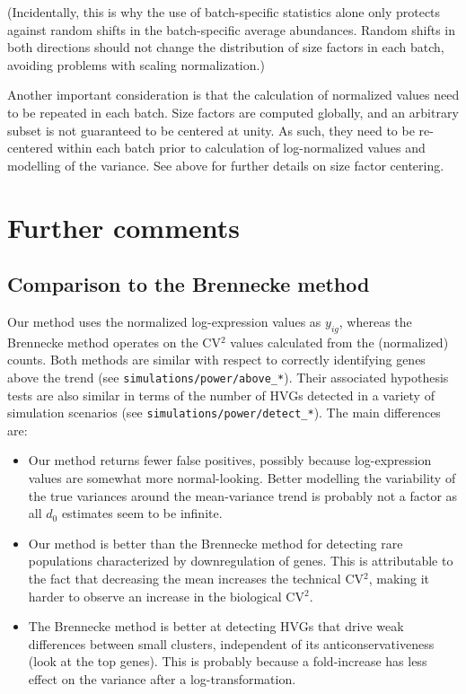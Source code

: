 \documentclass{article}
\begin{document}
(Incidentally, this is why the use of batch-specific statistics alone only protects against random shifts in the batch-specific average abundances.
Random shifts in both directions should not change the distribution of size factors in each batch, avoiding problems with scaling normalization.)

Another important consideration is that the calculation of normalized values need to be repeated in each batch.
Size factors are computed globally, and an arbitrary subset is not guaranteed to be centered at unity.
As such, they need to be re-centered within each batch prior to calculation of log-normalized values and modelling of the variance.
See above for further details on size factor centering.

\section{Further comments}

\subsection{Comparison to the Brennecke method}
Our method uses the normalized log-expression values as $y_{ig}$, whereas the Brennecke method operates on the CV$^2$ values calculated from the (normalized) counts.
Both methods are similar with respect to correctly identifying genes above the trend (see \texttt{simulations/power/above\_*}).
Their associated hypothesis tests are also similar in terms of the number of HVGs detected in a variety of simulation scenarios (see \texttt{simulations/power/detect\_*}).
The main differences are:
\begin{itemize}
\item Our method returns fewer false positives, possibly because log-expression values are somewhat more normal-looking. 
Better modelling the variability of the true variances around the mean-variance trend is probably not a factor as all $d_0$ estimates seem to be infinite.
\item Our method is better than the Brennecke method for detecting rare populations characterized by downregulation of genes.
This is attributable to the fact that decreasing the mean increases the technical CV$^2$, making it harder to observe an increase in the biological CV$^2$.
\item The Brennecke method is better at detecting HVGs that drive weak differences between small clusters, independent of its anticonservativeness (look at the top genes).
This is probably because a fold-increase has less effect on the variance after a log-transformation.
\end{itemize}
\end{document}

